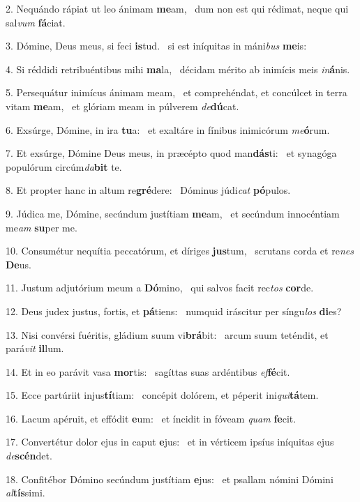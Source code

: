 2. Nequándo rápiat ut leo ánimam \textbf{me}am, \ast\  dum non est qui rédimat, neque qui sal\textit{vum} \textbf{fá}ciat.\

3. Dómine, Deus meus, si feci \textbf{is}tud. \ast\  si est iníquitas in máni\textit{bus} \textbf{me}is:\

4. Si réddidi retribuéntibus mihi \textbf{ma}la, \ast\  décidam mérito ab inimícis meis \textit{in}\textbf{á}nis.\

5. Persequátur inimícus ánimam meam, \dag\  et comprehéndat, et concúlcet in terra vitam \textbf{me}am, \ast\  et glóriam meam in púlverem \textit{de}\textbf{dú}cat.\

6. Exsúrge, Dómine, in ira \textbf{tu}a: \ast\  et exaltáre in fínibus inimicórum \textit{me}\textbf{ó}rum.\

7. Et exsúrge, Dómine Deus meus, in præcépto quod man\textbf{dás}ti: \ast\  et synagóga populórum circúm\textit{da}\textbf{bit} te.\

8. Et propter hanc in altum re\textbf{gré}dere: \ast\  Dóminus júdi\textit{cat} \textbf{pó}pulos.\

9. Júdica me, Dómine, secúndum justítiam \textbf{me}am, \ast\  et secúndum innocéntiam me\textit{am} \textbf{su}per me.\

10. Consumétur nequítia peccatórum, et díriges \textbf{jus}tum, \ast\  scrutans corda et re\textit{nes} \textbf{De}us.\

11. Justum adjutórium meum a \textbf{Dó}mino, \ast\  qui salvos facit rec\textit{tos} \textbf{cor}de.\

12. Deus judex justus, fortis, et \textbf{pá}tiens: \ast\  numquid iráscitur per síngu\textit{los} \textbf{di}es?\

13. Nisi convérsi fuéritis, gládium suum vi\textbf{brá}bit: \ast\  arcum suum teténdit, et pará\textit{vit} \textbf{il}lum.\

14. Et in eo parávit vasa \textbf{mor}tis: \ast\  sagíttas suas ardéntibus \textit{ef}\textbf{fé}cit.\

15. Ecce partúriit injus\textbf{tí}tiam: \ast\  concépit dolórem, et péperit ini\textit{qui}\textbf{tá}tem.\

16. Lacum apéruit, et effódit \textbf{e}um: \ast\  et íncidit in fóveam \textit{quam} \textbf{fe}cit.\

17. Convertétur dolor ejus in caput \textbf{e}jus: \ast\  et in vérticem ipsíus iníquitas ejus \textit{de}\textbf{scén}det.\

18. Confitébor Dómino secúndum justítiam \textbf{e}jus: \ast\  et psallam nómini Dómini \textit{al}\textbf{tís}simi.\

